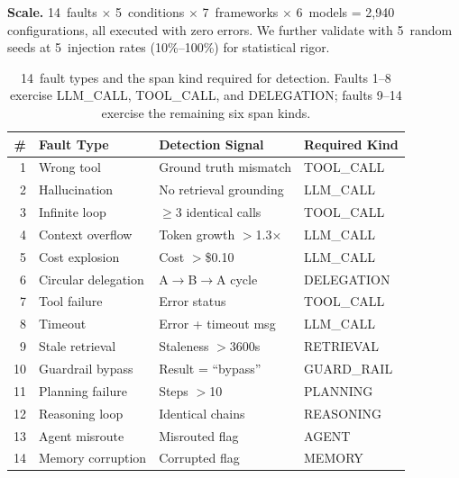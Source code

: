 \documentclass[sigplan,10pt,screen]{acmart}
\begin{document}
\textbf{Scale.}  14~faults $\times$ 5~conditions $\times$ 7~frameworks
$\times$ 6~models = 2{,}940 configurations, all executed with zero
errors.  We further validate with 5~random seeds at 5~injection rates
(10\%--100\%) for statistical rigor.

\begin{table}[t]
\centering
\small
\caption{14~fault types and the span kind required for detection.
Faults 1--8 exercise LLM\_CALL, TOOL\_CALL, and DELEGATION; faults
9--14 exercise the remaining six span kinds.}
\label{tab:faults}
\begin{tabular}{@{}rlll@{}}
\toprule
\textbf{\#} & \textbf{Fault Type} & \textbf{Detection Signal} & \textbf{Required Kind} \\
\midrule
1  & Wrong tool          & Ground truth mismatch  & TOOL\_CALL \\
2  & Hallucination       & No retrieval grounding & LLM\_CALL \\
3  & Infinite loop       & $\geq$3 identical calls & TOOL\_CALL \\
4  & Context overflow    & Token growth $>$1.3$\times$ & LLM\_CALL \\
5  & Cost explosion      & Cost $>$\$0.10        & LLM\_CALL \\
6  & Circular delegation & A$\to$B$\to$A cycle    & DELEGATION \\
7  & Tool failure        & Error status           & TOOL\_CALL \\
8  & Timeout             & Error + timeout msg    & LLM\_CALL \\
9  & Stale retrieval     & Staleness $>$3600s     & RETRIEVAL \\
10 & Guardrail bypass    & Result = ``bypass''    & GUARD\_RAIL \\
11 & Planning failure    & Steps $>$10            & PLANNING \\
12 & Reasoning loop      & Identical chains       & REASONING \\
13 & Agent misroute      & Misrouted flag         & AGENT \\
14 & Memory corruption   & Corrupted flag         & MEMORY \\
\bottomrule
\end{tabular}
\end{table}
\end{document}
